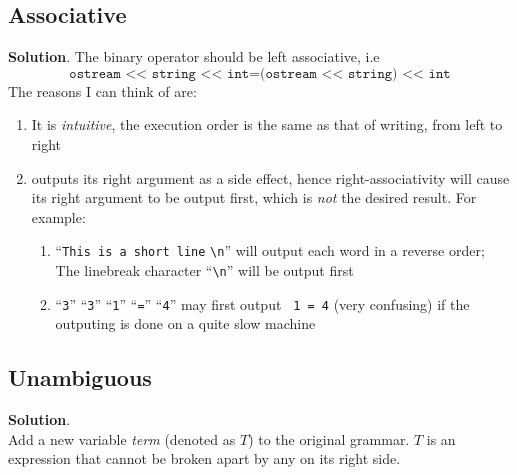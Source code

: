 \subsection{Associative}
\textbf{Solution}.
The binary operator \cpp should be left associative, i.e
\[
\texttt{ostream << string << int} = \texttt{(ostream << string) << int}
\]
The reasons I can think of are:
\begin{enumerate}
\item It is \emph{intuitive}, the execution order is the same as that of writing, from left to right
\item \cpp outputs its right argument as a side effect, hence right-associativity will cause its right argument to be output first, which is \emph{not} the desired result.  For example:
  \begin{enumerate}
  \item ``\texttt{This is a short line} \verb|\n|'' will output each word in a reverse order; The linebreak character ``\verb|\n|'' will be output first
  \item ``\texttt{3}'' \cpp ``\texttt{3}'' \cpp ``\texttt{1}'' \cpp ``\texttt{=}'' \cpp ``\texttt{4}'' may first output \texttt{ 1 = 4} (very confusing) if the outputing is done on a quite slow machine
  \end{enumerate}
\end{enumerate}
\subsection{Unambiguous}
\textbf{Solution}.\\
Add a new variable \emph{term} (denoted as \(T\)) to the original grammar.  \(T\) is an expression that cannot be broken apart by any \cpp on its right side.

